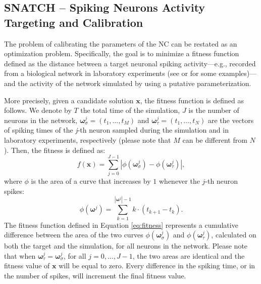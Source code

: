 \documentclass[utf8]{frontiersFPHY} %
\begin{document}
\subsection{SNATCH -- Spiking Neurons Activity Targeting and Calibration} 


The problem of calibrating the parameters of the NC can be restated as an optimization problem.
Specifically, the goal is to minimize a fitness function defined as the distance between a target neuronal spiking activity---e.g., recorded from a biological network in laboratory experiments (see \cite{} or \cite{} for some  examples)---and the activity of the network simulated by using a putative parameterization. 

More precisely, given a candidate solution $\textbf{x}$, the fitness function is defined as follows. 
We denote by $T$ the total time of the simulation,  $J$ is the number of neurons in the network, $\boldsymbol{\omega}_{\sigma}^j = (t_1, \dots, t_M)$ and $\boldsymbol{\omega}_{\tau}^j = (t_1, \dots, t_N)$ are the vectors of spiking times of the \textit{j}-th neuron sampled during the simulation and in laboratory experiments, respectively (please note that $M$ can be different from $N$). 
Then, the fitness is defined as:
\begin{equation}
f(\textbf{x}) = \displaystyle \sum_{j=0}^{J-1} \left|\phi(\boldsymbol{\omega}_{\sigma}^j) - \phi(\boldsymbol{\omega}_{\tau}^j)\right|,
\label{eq:fitness}
\end{equation}
where $\phi$ is the area of a curve that increases by $1$ whenever the $j$-th neuron spikes:
\begin{equation}
    \phi(\boldsymbol{\omega}^j) = \sum_{k=1}^{|\boldsymbol{\omega}^j|-1} k \cdot ( t_{k+1} - t_k ).
\end{equation}
The fitness function defined in Equation \ref{eq:fitness} represents a cumulative difference between the area of the two curves $\phi(\boldsymbol{\omega}^j_{\sigma})$ and $\phi(\boldsymbol{\omega}^j_{\tau})$, calculated on both the target and the simulation, for all neurons in the network. 
Please note that when $\boldsymbol{\omega}_{\tau}^j = \boldsymbol{\omega}_{\sigma}^j$, for all $j=0, \dots, J-1$,  the two areas are identical and the fitness value of $\textbf{x}$ will be equal to zero.
Every difference in the spiking time, or in the number of spikes, will increment the final fitness value.
\end{document}
